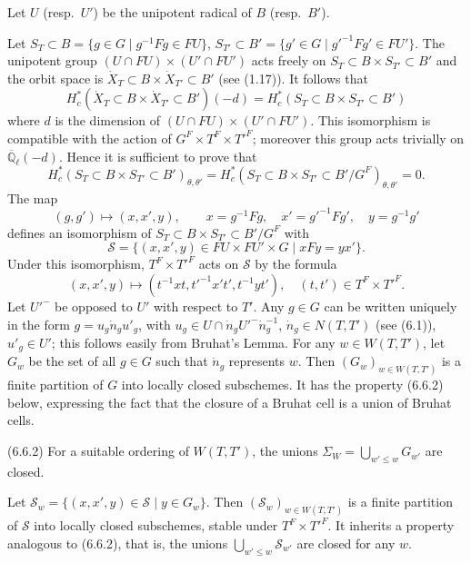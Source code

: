\documentclass[11pt]{amsart}
\theoremstyle{plain}
\theoremstyle{remark}
\begin{document}
Let $U$ (resp.\ $U'$) be the unipotent radical of $B$ (resp.\ $B'$).

Let $S_T \subset B = \{g \in G \mid g^{-1}Fg \in FU\}$, $S_{T'} \subset B' = \{g' \in G \mid g'^{-1}Fg' \in FU'\}$. The unipotent group $(U \cap FU) \times (U' \cap FU')$ acts freely on $S_T \subset B \times S_{T'} \subset B'$ and the orbit space is $\dot{X}_T \subset B \times \dot{X}_{T'} \subset B'$ (see (1.17)). It follows that
\[
H_c^*(\dot{X}_T \subset B \times \dot{X}_{T'} \subset B')(-d) = H_c^*(S_T \subset B \times S_{T'} \subset B')
\]
where $d$ is the dimension of $(U \cap FU) \times (U' \cap FU')$. This isomorphism is compatible with the action of $G^F \times T^F \times T'^F$; moreover this group acts trivially on $\overline{\mathbb{Q}}_\ell(-d)$. Hence it is sufficient to prove that
\[
H_c^*(S_T \subset B \times S_{T'} \subset B')_{\theta, \theta'} = H_c^*(S_T \subset B \times S_{T'} \subset B'/G^F)_{\theta, \theta'} = 0.
\]
The map
\[
(g, g') \longmapsto (x, x', y), \qquad x = g^{-1}Fg, \quad x' = g'^{-1}Fg', \quad y = g^{-1}g'
\]
defines an isomorphism of $S_T \subset B \times S_{T'} \subset B'/G^F$ with
\[
\mathcal{S} = \{(x, x', y) \in FU \times FU' \times G \mid xFy = yx'\}.
\]
Under this isomorphism, $T^F \times T'^F$ acts on $\mathcal{S}$ by the formula
\begin{equation}\label{eq:6.6.1}
(x, x', y) \longmapsto (t^{-1}xt, t'^{-1}x't', t^{-1}yt'), \quad (t, t') \in T^F \times T'^F.
\end{equation}
Let $U'^-$ be opposed to $U'$ with respect to $T'$. Any $g \in G$ can be written uniquely in the form $g = u_g \dot{n}_g u'_g$, with $u_g \in U \cap \dot{n}_g U'^- \dot{n}_g^{-1}$, $\dot{n}_g \in N(T, T')$ (see (6.1)), $u'_g \in U'$; this follows easily from Bruhat's Lemma. For any $w \in W(T, T')$, let $G_w$ be the set of all $g \in G$ such that $\dot{n}_g$ represents $w$. Then $(G_w)_{w \in W(T, T')}$ is a finite partition of $G$ into locally closed subschemes. It has the property (6.6.2) below, expressing the fact that the closure of a Bruhat cell is a union of Bruhat cells.

(6.6.2) For a suitable ordering of $W(T, T')$, the unions $\Sigma_W = \bigcup_{w' \le w} G_{w'}$ are closed.

Let $\mathcal{S}_w = \{(x, x', y) \in \mathcal{S} \mid y \in G_w\}$. Then $(\mathcal{S}_w)_{w \in W(T, T')}$ is a finite partition of $\mathcal{S}$ into locally closed subschemes, stable under $T^F \times T'^F$. It inherits a property analogous to (6.6.2), that is, the unions $\bigcup_{w' \le w} \mathcal{S}_{w'}$ are closed for any $w$.
\end{document}
